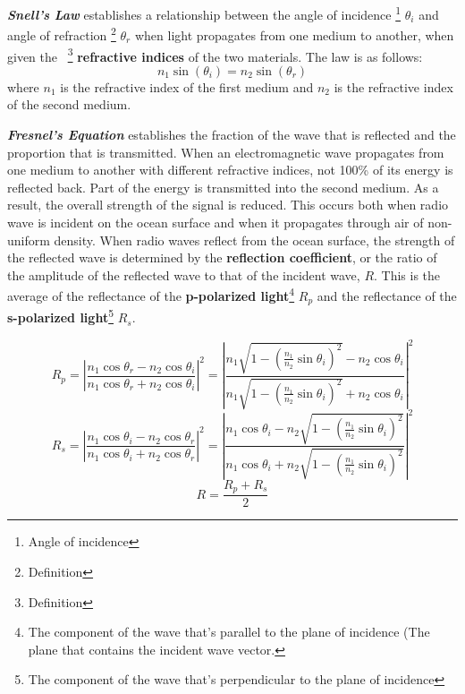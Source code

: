 \documentclass{article}
\begin{document}
\textbf{\textit{Snell's Law}} establishes a relationship between the angle of incidence \footnote{Angle of incidence} $\theta_i$  and angle of refraction \footnote{Definition} $\theta_r$ when light propagates from one medium to another, when given the \ \footnote{Definition} \textbf{refractive indices} of the two materials. The law is as follows:
\begin{equation}
    n_1 \sin\left(\theta_i\right) = n_2 \sin\left(\theta_r\right)
\end{equation}
where $n_1$ is the refractive index of the first medium and $n_2$ is the refractive index of the second medium.

\textbf{\textit{Fresnel's Equation}} establishes the fraction of the wave that is reflected and the proportion that is transmitted. When an electromagnetic wave propagates from one medium to another with different refractive indices, not 100\% of its energy is reflected back. Part of the energy is transmitted into the second medium. As a result, the overall strength of the signal is reduced. This occurs both when radio wave is incident on the ocean surface and when it propagates through air of non-uniform density. 
When radio waves reflect from the ocean surface, the strength of the reflected wave is determined by the \textbf{reflection coefficient}, or the ratio of the amplitude of the reflected wave to that of the incident wave, $R$. This is the average of the reflectance of the \textbf{p-polarized light}\footnote{The component of the wave that's parallel to the plane of incidence (The plane that contains the incident wave vector.} $R_p$ and the reflectance of the \textbf{s-polarized light}\footnote{The component of the wave that's perpendicular to the plane of incidence} $R_s$.

\begin{equation}
    R_p = \left|\frac{n_1 \cos\theta_r - n_2\cos\theta_i}{n_1\cos\theta_r + n_2 \cos\theta_i}\right|^2 = \left|\frac{n_1 \sqrt{1 - \left(\frac{n_1}{n_2} \sin \theta_i\right)^2} - n_2 \cos \theta_i}{n_1 \sqrt{1 - \left(\frac{n_1}{n_2} \sin \theta_i\right)^2} + n_2 \cos \theta_i}\right|^2
\end{equation}
\begin{equation}
    R_s = \left|\frac{n_1 \cos \theta_i - n_2 \cos \theta_r}{n_1 \cos \theta_i + n_2 \cos \theta_r}\right|^2 = \left|\frac{n_1 \cos \theta_i - n_2 \sqrt{1 - \left(\frac{n_1}{n_2} \sin \theta_i\right)^2}}{n_1 \cos \theta_i + n_2 \sqrt{1 - \left(\frac{n_1}{n_2} \sin \theta_i\right)^2}}\right|^2
\end{equation}
\begin{equation}
    R = \frac{R_p + R_s}{2}
\end{equation}
\end{document}
